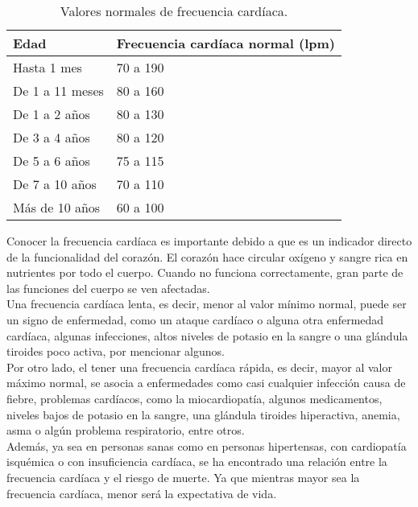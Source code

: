 	\begin{table}[htbp]
		\begin{center}
			\begin{tabular}{|l|l|}
				\hline
				\textbf{Edad} & \textbf{Frecuencia cardíaca normal (lpm)} \\
				\hline \hline
				Hasta 1 mes & 70 a 190  \\
				\hline
				De 1 a 11 meses & 80 a 160  \\
				\hline
				De 1 a 2 años & 80 a 130  \\
				\hline
				De 3 a 4 años & 80 a 120  \\
				\hline
				De 5 a 6 años & 75 a 115  \\
				\hline
				De 7 a 10 años & 70 a 110  \\
				\hline
				Más de 10 años & 60 a 100  \\
				\hline
			\end{tabular}
			\caption{Valores normales de frecuencia cardíaca.}
		\end{center}
	\end{table}

	Conocer la frecuencia cardíaca es importante debido a que es un indicador directo de la funcionalidad del corazón. El corazón hace circular oxígeno y sangre rica en nutrientes por todo el cuerpo. Cuando no funciona correctamente, gran parte de las funciones del cuerpo se ven afectadas. \\
	
	Una frecuencia cardíaca lenta, es decir, menor al valor mínimo normal, puede ser un signo de enfermedad, como un ataque cardíaco o alguna otra enfermedad cardíaca, algunas infecciones, altos niveles de potasio en la sangre o una glándula tiroides poco activa, por mencionar algunos. \cite{HeartRateHarvard}\\
	
	Por otro lado, el tener una frecuencia cardíaca rápida, es decir, mayor al valor máximo normal, se asocia a enfermedades como casi cualquier infección causa de fiebre, problemas cardíacos, como la miocardiopatía, algunos medicamentos, niveles bajos de potasio en la sangre, una glándula tiroides hiperactiva, anemia, asma o algún problema respiratorio, entre otros. \cite{HeartRateHarvard}\\
	
	Además, ya sea en personas sanas como en personas hipertensas, con cardiopatía isquémica o con insuficiencia cardíaca, se ha encontrado una relación entre la frecuencia cardíaca y el riesgo de muerte. Ya que mientras mayor sea la frecuencia cardíaca, menor será la expectativa de vida. \cite{FundEspCorFreq}
	
